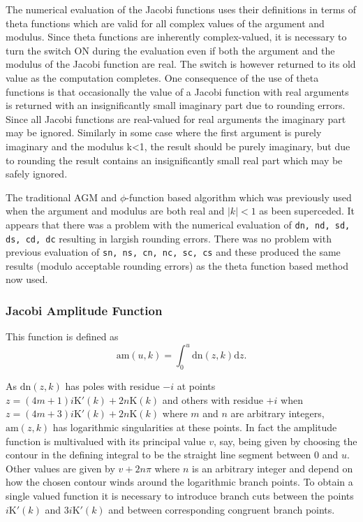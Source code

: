 The numerical evaluation of the Jacobi functions uses their definitions
in terms of theta functions which are valid for all complex values of the
argument and modulus.  Since theta functions are inherently complex-valued,
it is necessary to turn the switch  ON during the evaluation even
if both the argument and the modulus of the Jacobi function are real. The
switch  is however returned to its old value as the computation
completes.  One consequence of the use of theta functions is that occasionally
the value of a Jacobi function with real arguments is returned with an
insignificantly small imaginary part due to rounding errors. Since all Jacobi
functions are real-valued for real arguments the imaginary part may be ignored.
Similarly in some case where the first argument is purely imaginary and the
modulus k<1, the result should be purely imaginary, but due to rounding the
result contains an insignificantly small real part which may be safely ignored.

The traditional AGM and  $\phi$-function based algorithm which was previously
used when the argument and modulus are both real and $|k| < 1$ as been
superceded. It appears that there was a problem with the numerical evaluation
of \texttt{dn, nd, sd, ds, cd, dc} resulting in largish rounding errors. There
was no problem with previous evaluation of \texttt{sn, ns, cn, nc, sc, cs} and
these produced the same results (modulo acceptable rounding errors) as the
theta function based method now used.

\subsubsection{Jacobi Amplitude Function}
\hypertarget{operator:JACOBIAM}{}
This function is defined as
\[ \mathrm{am}(u,k) = \int_0^u\mathrm{dn}(z,k)\mathrm{d}z.\]

As $\mathrm{dn}(z,k)$ has poles with residue $-i$ at points
$z=(4m+1)i\mathrm{K}'(k)+2n\mathrm{K}(k)$ and others with residue $+i$ when
$z=(4m+3)i\mathrm{K}'(k)+2n\mathrm{K}(k)$ where $m$ and $n$ are arbitrary
integers, $\mathrm{am}(z,k)$ has logarithmic singularities at these points.
In fact the amplitude function is multivalued with its principal value $v$, say,
being given by choosing the contour in the defining integral to be the
straight line segment between $0$ and $u$.  Other values are given by $v+2n\pi$
where $n$ is an arbitrary integer and depend on how the chosen contour winds
around the logarithmic branch points.  To obtain a single valued function it is
necessary to introduce branch cuts between the points $i\mathrm{K}'(k)$ and
$3i\mathrm{K}'(k)$ and between corresponding congruent branch points.

